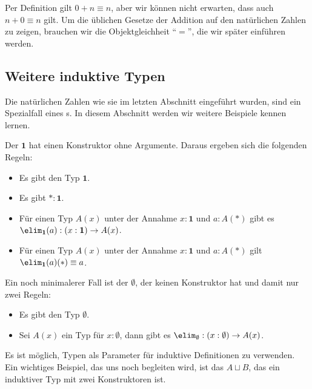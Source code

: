 \begin{bemerkung}
  Per Definition gilt $0+n\equiv n$, aber wir können nicht erwarten, dass auch $n+0\equiv n$ gilt.
  Um die üblichen Gesetze der Addition auf den natürlichen Zahlen zu zeigen, brauchen wir die Objektgleichheit ``$=$'', die wir später einführen werden.
\end{bemerkung}

\subsection{Weitere induktive Typen}
Die natürlichen Zahlen wie sie im letzten Abschnitt eingeführt wurden, sind ein Spezialfall eines
s. In diesem Abschnitt werden wir weitere Beispiele kennen lernen.

Der  $\mathbf{1}$ hat einen Konstruktor ohne Argumente.
Daraus ergeben sich die folgenden Regeln:

\begin{regeln}
\begin{itemize}
\item Es gibt den Typ $\mathbf{1}$. 
\item Es gibt $\ast:\mathbf{1}$. 
\item Für einen Typ $A(x)$ unter der Annahme $x:\mathbf{1}$ und $a:A(\ast)$
gibt es $\elim_{\mathbf{1}}(a):(x:\mathbf{1})\to A(x)$.
\item Für einen Typ $A(x)$ unter der Annahme $x:\mathbf{1}$ und $a:A(\ast)$
gilt $\elim_{\mathbf{1}}(a)(\ast)\equiv a$.
\end{itemize}
\end{regeln}

Ein noch minimalerer Fall ist der  $\emptyset$\index{$\emptyset$},
der keinen Konstruktor hat und damit nur zwei Regeln:

\begin{regeln}
\begin{itemize}
\item Es gibt den Typ $\emptyset$. 
\item Sei $A(x)$ ein Typ für $x:\emptyset$, dann gibt es $\elim_\emptyset:(x:\emptyset)\to A(x)$.
\end{itemize}
\end{regeln}

Es ist möglich, Typen als Parameter für induktive Definitionen zu verwenden.
Ein wichtiges Beispiel, das uns noch begleiten wird, ist das  $A\sqcup B$, das ein induktiver Typ mit zwei Konstruktoren ist.

